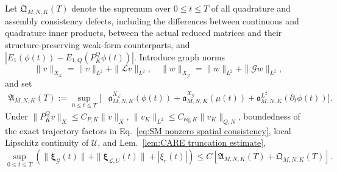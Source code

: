 \documentclass[10pt,reqno]{amsart}
\theoremstyle{remark}
\theoremstyle{definition}
\begin{document}
Let $\mathfrak Q_{M,N,K}(T)$ denote the supremum over $0\le t\le T$ of all quadrature and assembly consistency defects, including the differences between continuous and quadrature inner products, between the actual reduced matrices and their structure-preserving weak-form counterparts, and $|E_1(\phi(t))-E_{1,Q}(P_K^Q\phi(t))|$. Introduce graph norms
$$
\|v\|_{X_{\mathcal L}}=\|v\|_{L^2}+\|\mathcal Lv\|_{L^2},
\quad
\|w\|_{X_{\mathcal G}}=\|w\|_{L^2}+\|\mathcal Gw\|_{L^2},
$$
and set
\begin{equation}
  \begin{aligned}
    \mathfrak A_{M,N,K}(T):=\sup_{0\le t\le T}\bigl[&\mathfrak a_{M,N,K}^{X_{\mathcal L}}(\phi(t))+\mathfrak a_{M,N,K}^{X_{\mathcal G}}(\mu(t))
    +\mathfrak a_{M,N,K}^{L^2}(\partial_t\phi(t))\bigr].
  \end{aligned}
\end{equation}
Under $\|P_K^Q v\|_X\le C_{P,K}\|v\|_X$, $\|v_K\|_{L^2}\le C_{\mathrm{eq},K}\|v_K\|_{Q,N}$, boundedness of the exact trajectory factors in Eq.~\eqref{eq:SM nonzero spatial consistency}, local Lipschitz continuity of $\mathcal U$, and Lem.~\ref{lem:CARE truncation estimate},
\begin{equation}
  \sup_{0\le t\le T} \left(\|\boldsymbol\xi_{\mathcal G}(t)\| +\|\boldsymbol\xi_{\mathcal L,U}(t)\|+|\xi_r(t)|\right)\le C\left[\mathfrak A_{M,N,K}(T)+\mathfrak Q_{M,N,K}(T)\right].
\end{equation}
\end{document}
